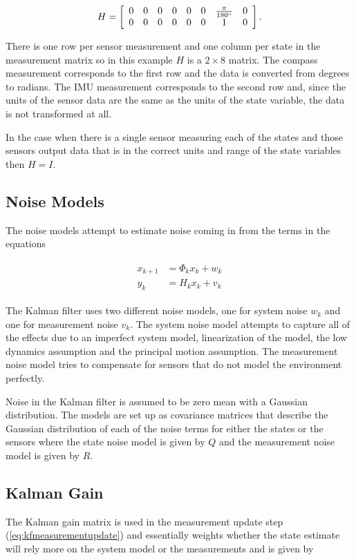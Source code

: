 \begin{align*}
H = \left[\begin{array}{c c c c c c c c}
0 & 0 & 0 & 0 & 0 & 0 & \frac{\pi}{180^\circ} & 0 \\
0 & 0 & 0 & 0 & 0 & 0 & 1 & 0
\end{array}\right].
\end{align*}

There is one row per sensor measurement and one column per state in the measurement matrix so in this example $H$ is a $2\times8$ matrix. The compass measurement corresponds to the first row and the data is converted from degrees to radians. The IMU measurement corresponds to the second row and, since the units of the sensor data are the same as the units of the state variable, the data is not transformed at all.

In the case when there is a single sensor measuring each of the states and those sensors output data that is in the correct units and range of the state variables then $H=I$.

\subsection{Noise Models}
\label{sec:kfNoiseModels}
The noise models attempt to estimate noise coming in from the terms in the equations

\begin{align*}
\begin{split}
x_{k+1} &= \Phi_kx_k + w_k \\
y_k &= H_kx_k + v_k
\end{split}
\end{align*}

The Kalman filter uses two different noise models, one for system noise $w_k$ and one for measurement noise $v_k$. The system noise model attempts to capture all of the effects due to an imperfect system model, linearization of the model, the low dynamics assumption and the principal motion assumption. The measurement noise model tries to compensate for sensors that do not model the environment perfectly.

Noise in the Kalman filter is assumed to be zero mean with a Gaussian distribution. The models are set up as covariance matrices that describe the Gaussian distribution of each of the noise terms for either the states or the sensors where the state noise model is given by $Q$ and the measurement noise model is given by $R$.

\subsection{Kalman Gain}
\label{kfKalmanGain}
The Kalman gain matrix is used in the measurement update step (\ref{eq:kfmeasurementupdate}) and essentially weights whether the state estimate will rely more on the system model or the measurements and is given by


